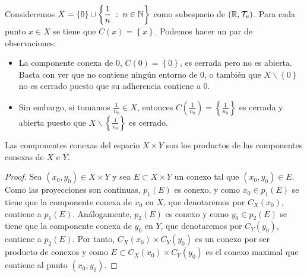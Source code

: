 \begin{eg}
	Consideremos $\displaystyle X = \left\{ 0\right\} \cup \left\{ \frac{1}{n} \; : \; n \in \mathbb{N}\right\}  $ como subespacio de $\displaystyle \left(\mathbb{R}, \mathcal{T}_{u}\right) $. Para cada punto $\displaystyle x \in X $ se tiene que $\displaystyle C\left(x\right)= \left\{ x\right\}  $. Podemos hacer un par de observaciones:
	\begin{itemize}
	\item La componente conexa de 0, $\displaystyle C\left(0\right)= \left\{ 0\right\}  $, es cerrada pero no es abierta. Basta con ver que no contiene ningún entorno de 0, o también que $\displaystyle X \backslash \left\{ 0\right\}  $ no es cerrado puesto que su adherencia contiene a 0. 
	\item Sin embargo, si tomamos $\displaystyle \frac{1}{n_{0}}\in X $, entonces $\displaystyle C\left(\frac{1}{n_{0}}\right)= \left\{ \frac{1}{n_{0}}\right\}  $ es cerrada y abierta puesto que $\displaystyle X \backslash \left\{ \frac{1}{n_{0}}\right\}  $ es cerrado.
	\end{itemize}
\end{eg}
\begin{prop}
Las componentes conexas del espacio $\displaystyle X \times Y $ son los productos de las componentes conexas de $\displaystyle X $ e $\displaystyle Y $.
\end{prop}
\begin{proof}
Sea $\displaystyle \left(x_{0}, y_{0}\right)\in X \times Y $ y sea $\displaystyle E \subset X \times Y $ un conexo tal que $\displaystyle \left(x_{0}, y_{0}\right)\in E $. Como las proyecciones son continuas, $\displaystyle p_{1}\left(E\right) $ es conexo, y como $\displaystyle x_{0}\in p_{1}\left(E\right) $ se tiene que la componente conexa de $\displaystyle x_{0} $ en $\displaystyle X $, que denotaremos por $\displaystyle C_{X}\left(x_{0}\right) $, contiene a $\displaystyle p_{1}\left(E\right) $. 
Análogamente, $\displaystyle p_{2}\left(E\right) $ es conexo y como $\displaystyle y_{0}\in p_{2}\left(E\right) $ se tiene que la componente conexa de $\displaystyle y_{0} $ en $\displaystyle Y $, que denotaremos por $\displaystyle C_{Y}\left(y_{0}\right) $, contiene a $\displaystyle p_{2}\left(E\right) $. Por tanto, $\displaystyle C_{X}\left(x_{0}\right)\times C_{Y}\left(y_{0}\right) $ es un conexo por ser producto de conexos y como $\displaystyle E \subset C_{X}\left(x_{0}\right)\times C_{Y}\left(y_{0}\right) $ es el conexo maximal que contiene al punto $\displaystyle \left(x_{0}, y_{0}\right) $. 
\end{proof}
